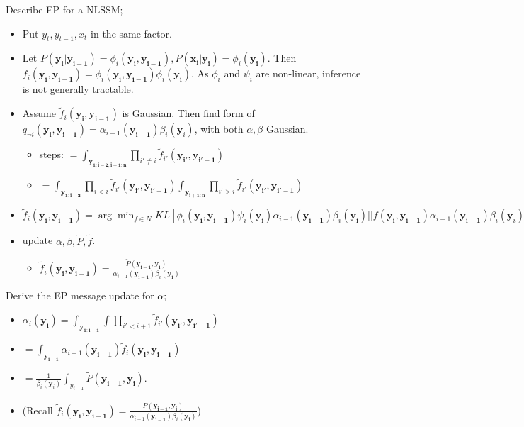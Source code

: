 \documentclass{article}
\begin{document}
Describe EP for a NLSSM; \begin{itemize}
    \item Put $y_t, y_{t-1}, x_t$ in the same factor.
    \item Let $P(\mathbf{y_i|y_{i-1}}) = \phi_i(\mathbf{y_i, y_{i-1}}), P(\mathbf{x_i|y_i}) = \phi_i(\mathbf{y_i})$. Then $f_i(\mathbf{y_i, y_{i-1}}) = \phi_i(\mathbf{y_i, y_{i-1}})\phi_i(\mathbf{y_i})$. As $\phi_i$ and $\psi_i$ are non-linear, inference is not generally tractable.
    \item Assume $\tilde{f}_i(\mathbf{y_i, y_{i-1}})$ is Gaussian. Then find form of $q_{\neg i}(\mathbf{y_i, y_{i-1}}) = \alpha_{i-1}(\mathbf{y_{i-1}})\beta_i(\mathbf{y}_i)$, with both $\alpha, \beta$ Gaussian. \begin{itemize}
        \item steps: $=\int_{\mathbf{y_{1:i-2, i+1:n}}} \prod_{i'\ne i}\tilde{f}_{i'}(\mathbf{y_{i'}, y_{i'-1}})$
        \item $=\int_{\mathbf{y_{1:i-2}}} \prod_{i< i}\tilde{f}_{i'}(\mathbf{y_{i'}, y_{i'-1}}) \int_{\mathbf{y_{i+1:n}}} \prod_{i'> i}\tilde{f}_{i'}(\mathbf{y_{i'}, y_{i'-1}})$
    \end{itemize}
    \item $\tilde{f}_i(\mathbf{y_i, y_{i-1}}) = \arg\min_{f\in N} KL[\phi_i(\mathbf{y_i, y_{i-1}})\psi_i(\mathbf{y_i})\alpha_{i-1}(\mathbf{y_{i-1}})\beta_i(\mathbf{y_i}) || f(\mathbf{y_i, y_{i-1}})\alpha_{i-1}(\mathbf{y_{i-1}})\beta_i(\mathbf{y}_i)]$
    \item update $\alpha, \beta, \tilde{P}, \tilde{f}$. \begin{itemize}
        \item $\tilde{f}_i(\mathbf{y_i, y_{i-1}}) = \frac{\tilde{P}(\mathbf{y_{i-1}, y_i})}{\alpha_{i-1}(\mathbf{y_{i-1}})\beta_i(\mathbf{y_i})}$
    \end{itemize} 
\end{itemize}

Derive the EP message update for $\alpha$; \begin{itemize}
    \item $\alpha_i(\mathbf{y_i}) = \int_{\mathbf{y_{1:i-1}}} \int \prod_{i'<i+1} \tilde{f}_{i'}(\mathbf{y_{i'}, \mathbf{y}_{i'-1}}) 
    $
    \item $= \int_{\mathbf{y_{i-1}}}\alpha_{i-1}(\mathbf{y_{i-1}})\tilde{f}_i(\mathbf{y_i, y_{i-1}})$
    \item $= \frac{1}{\beta_i(\mathbf{y}_i)}\int_{y_{i-1}}\tilde{P}(\mathbf{y_{i-1},y_i})$.
    \item (Recall $\tilde{f}_i(\mathbf{y_i, y_{i-1}}) = \frac{\tilde{P}(\mathbf{y_{i-1}, y_i})}{\alpha_{i-1}(\mathbf{y_{i-1}})\beta_i(\mathbf{y_i})}$)
\end{itemize} 
\end{document}
